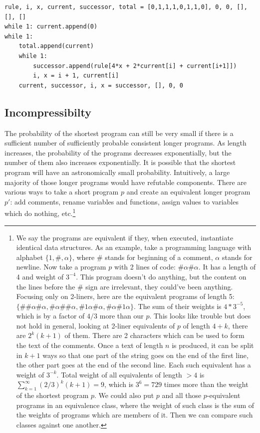 \begin{lstlisting}[caption={A short program generating an infinite universe of Rule 110. The question of how indexical information works in an infinite universe is addressed later in the document.}]
rule, i, x, current, successor, total = [0,1,1,1,0,1,1,0], 0, 0, [], [], []
while 1: current.append(0)
while 1:
	total.append(current)
	while 1:
		successor.append(rule[4*x + 2*current[i] + current[i+1]])
		i, x = i + 1, current[i]
	current, successor, i, x = successor, [], 0, 0
\end{lstlisting}

\newpage

\subsection{Incompressibilty}

The probability of the shortest program can still be very small if there is a sufficient number of sufficiently probable consistent longer programs.
As length increases, the probability of the programs decreases exponentially, but the number of them also increases exponentially.
It is possible that the shortest program will have an astronomically small probability.
Intuitively, a large majority of those longer programs would have refutable components. 
There are various ways to take a short program $p$ and create an equivalent longer program $p'$: add comments, rename variables and functions, assign values to variables which do nothing, etc.\footnote{
We say the programs are equivalent if they, when executed, instantiate identical data structures.
As an example, take a programming language with alphabet $\{1,\#,\alpha\}$, where \# stands for beginning of a comment, $\alpha$ stands for newline.
Now take a program $p$ with 2 lines of code: $\#\alpha\#\alpha$.
It has a length of 4 and weight of $3^{-4}$.
This program doesn't do anything, but the content on the lines before the \# sign are irrelevant, they could've been anything.
Focusing only on 2-liners, here are the equivalent programs of length 5: $\{\#\#\alpha\#\alpha, \#\alpha\#\#\alpha, \#1\alpha\#\alpha, \#\alpha\#1\alpha\}$.
The sum of their weights is $4 * 3^{-5}$, which is by a factor of $4/3$ more than our $p$.
This looks like trouble but does not hold in general, looking at 2-liner equivalents of $p$ of length $4+k$, there are $2^k(k+1)$ of them.
There are 2 characters which can be used to form the text of the comments.
Once a text of length $n$ is produced, it can be split in $k+1$ ways so that one part of the string goes on the end of the first line, the other part goes at the end of the second line.
Each such equivalent has a weight of $3^{-k}$.
Total weight of all equivalents of length $>4$ is $\sum_{k=1}^{\infty} (2/3)^k(k+1) = 9$, which is $3^6 = 729$ times more than the weight of the shortest program $p$.
We could also put $p$ and all those $p$-equivalent programs in an equivalence class, where the weight of such class is the sum of the weights of programs which are members of it.
Then we can compare such classes against one another.
}

